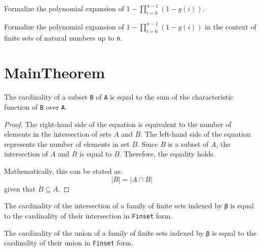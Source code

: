 \begin{lemma}\label{mul_expand₂}
  \leanok
  Formalize the polynomial expansion of \(1 - \prod_{i=0}^{n-1} (1 - g(i))\).
\end{lemma}

\begin{lemma}\label{mul_expand₁}
  \leanok
  Formalize the polynomial expansion of \(1 - \prod_{i=0}^{n-1} (1 - g(i))\) in the context of finite sets of natural numbers up to \verb|n|.
\end{lemma}


\section{MainTheorem}

\begin{lemma}\label{card_eq_sum_char_fun}
  \leanok
  The cardinality of a subset \verb|B| of \verb|A| is equal to the sum of the characteristic function of \verb|B| over \verb|A|.
\end{lemma}

\begin{proof}
  \leanok
  The right-hand side of the equation is equivalent to the number of elements in the intersection of sets $A$ and $B$. The left-hand side of the equation represents the number of elements in set $B$. Since $B$ is a subset of $A$, the intersection of $A$ and $B$ is equal to $B$. Therefore, the equality holds.

  Mathematically, this can be stated as:
  \begin{equation*}
  |B| = |A \cap B|
  \end{equation*}
  given that $B \subseteq A$.
\end{proof}

\begin{lemma}\label{card_eq_FinInter}
  The cardinality of the intersection of a family of finite sets indexed by \verb|β| is equal to the cardinality of their intersection in \verb|Finset| form.
\end{lemma}

\begin{lemma}\label{card_eq_FinUnion}
  The cardinality of the union of a family of finite sets indexed by \verb|β| is equal to the cardinality of their union in \verb|Finset| form.
\end{lemma}

